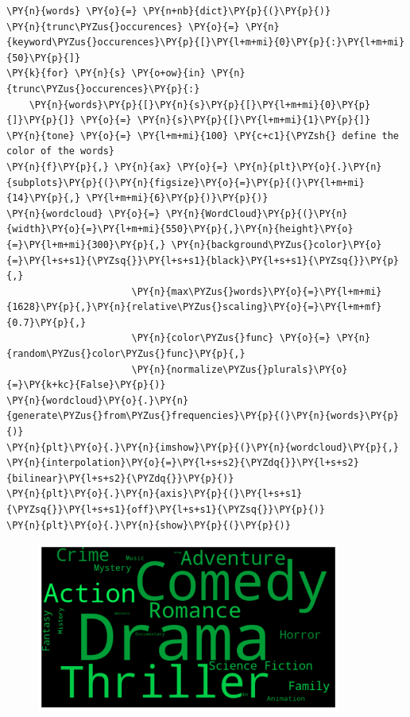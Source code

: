     \begin{tcolorbox}[breakable, size=fbox, boxrule=1pt, pad at break*=1mm,colback=cellbackground, colframe=cellborder]
\begin{Verbatim}[commandchars=\\\{\}]
\PY{n}{words} \PY{o}{=} \PY{n+nb}{dict}\PY{p}{(}\PY{p}{)}
\PY{n}{trunc\PYZus{}occurences} \PY{o}{=} \PY{n}{keyword\PYZus{}occurences}\PY{p}{[}\PY{l+m+mi}{0}\PY{p}{:}\PY{l+m+mi}{50}\PY{p}{]}
\PY{k}{for} \PY{n}{s} \PY{o+ow}{in} \PY{n}{trunc\PYZus{}occurences}\PY{p}{:}
    \PY{n}{words}\PY{p}{[}\PY{n}{s}\PY{p}{[}\PY{l+m+mi}{0}\PY{p}{]}\PY{p}{]} \PY{o}{=} \PY{n}{s}\PY{p}{[}\PY{l+m+mi}{1}\PY{p}{]}
\PY{n}{tone} \PY{o}{=} \PY{l+m+mi}{100} \PY{c+c1}{\PYZsh{} define the color of the words}
\PY{n}{f}\PY{p}{,} \PY{n}{ax} \PY{o}{=} \PY{n}{plt}\PY{o}{.}\PY{n}{subplots}\PY{p}{(}\PY{n}{figsize}\PY{o}{=}\PY{p}{(}\PY{l+m+mi}{14}\PY{p}{,} \PY{l+m+mi}{6}\PY{p}{)}\PY{p}{)}
\PY{n}{wordcloud} \PY{o}{=} \PY{n}{WordCloud}\PY{p}{(}\PY{n}{width}\PY{o}{=}\PY{l+m+mi}{550}\PY{p}{,}\PY{n}{height}\PY{o}{=}\PY{l+m+mi}{300}\PY{p}{,} \PY{n}{background\PYZus{}color}\PY{o}{=}\PY{l+s+s1}{\PYZsq{}}\PY{l+s+s1}{black}\PY{l+s+s1}{\PYZsq{}}\PY{p}{,} 
                      \PY{n}{max\PYZus{}words}\PY{o}{=}\PY{l+m+mi}{1628}\PY{p}{,}\PY{n}{relative\PYZus{}scaling}\PY{o}{=}\PY{l+m+mf}{0.7}\PY{p}{,}
                      \PY{n}{color\PYZus{}func} \PY{o}{=} \PY{n}{random\PYZus{}color\PYZus{}func}\PY{p}{,}
                      \PY{n}{normalize\PYZus{}plurals}\PY{o}{=}\PY{k+kc}{False}\PY{p}{)}
\PY{n}{wordcloud}\PY{o}{.}\PY{n}{generate\PYZus{}from\PYZus{}frequencies}\PY{p}{(}\PY{n}{words}\PY{p}{)}
\PY{n}{plt}\PY{o}{.}\PY{n}{imshow}\PY{p}{(}\PY{n}{wordcloud}\PY{p}{,} \PY{n}{interpolation}\PY{o}{=}\PY{l+s+s2}{\PYZdq{}}\PY{l+s+s2}{bilinear}\PY{l+s+s2}{\PYZdq{}}\PY{p}{)}
\PY{n}{plt}\PY{o}{.}\PY{n}{axis}\PY{p}{(}\PY{l+s+s1}{\PYZsq{}}\PY{l+s+s1}{off}\PY{l+s+s1}{\PYZsq{}}\PY{p}{)}
\PY{n}{plt}\PY{o}{.}\PY{n}{show}\PY{p}{(}\PY{p}{)}
\end{Verbatim}
\end{tcolorbox}
\begin{figure}[h]
    \centering
    \captionsetup{width=10cm}
    \includegraphics[width=10cm]{./contenido/imagenes/output_33_0.png}
\end{figure}

